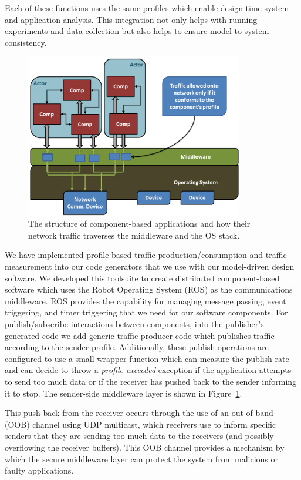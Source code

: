Each of these functions uses the same profiles which enable
design-time system and application analysis.  This integration not
only helps with running experiments and data collection but also helps
to ensure model to system consistency.
  
\begin{figure}[ht!]
  \centering
  \includegraphics[width=0.85\textwidth]{../doc/src/images/results/app_layers.png}
  \caption{The structure of component-based applications and how their network
   traffic traverses the middleware and the OS stack.}
  \label{fig:sender}
\end{figure}

We have implemented profile-based traffic production/consumption and
traffic measurement into our code generators that we use with our
model-driven design software.  We developed this toolsuite to create
distributed component-based software which uses the Robot Operating
System (ROS)\cite{ros} as the communications middleware.  ROS provides
the capability for managing message passing, event triggering, and
timer triggering that we need for our software components.  For
publish/subscribe interactions between components, into the
publisher's generated code we add generic traffic producer code which
publishes traffic according to the sender profile.  Additionally,
these publish operations are configured to use a small wrapper
function which can measure the publish rate and can decide to throw a
\emph{profile exceeded} exception if the application attempts to send
too much data or if the receiver has pushed back to the sender
informing it to stop.  The sender-side middleware layer is shown in
Figure~\ref{fig:sender}.

This push back from the receiver occurs through the use of an
out-of-band (OOB) channel using UDP multicast, which receivers use to
inform specific senders that they are sending too much data to the
receivers (and possibly overflowing the receiver buffers).  This OOB
channel provides a mechanism by which the secure middleware layer can
protect the system from malicious or faulty applications.

